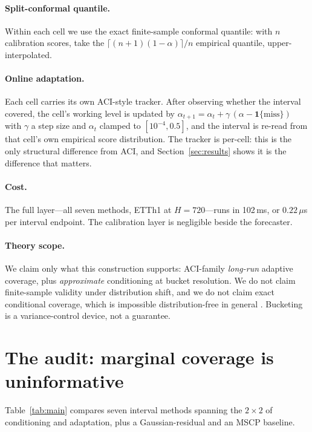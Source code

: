 \documentclass[11pt]{article}
\begin{document}
\paragraph{Split-conformal quantile.} Within each cell we use the exact finite-sample conformal quantile: with $n$ calibration scores, take the $\lceil (n+1)(1-\alpha) \rceil / n$ empirical quantile, upper-interpolated.

\paragraph{Online adaptation.} Each cell carries its own ACI-style tracker. After observing whether the interval covered, the cell's working level is updated by $\alpha_{t+1} = \alpha_t + \gamma\,(\alpha - \mathbf{1}\{\text{miss}\})$ with $\gamma$ a step size and $\alpha_t$ clamped to $[10^{-4}, 0.5]$, and the interval is re-read from that cell's own empirical score distribution. The tracker is per-cell: this is the only structural difference from ACI, and Section~\ref{sec:results} shows it is the difference that matters.

\paragraph{Cost.} The full layer---all seven methods, ETTh1 at $H=720$---runs in 102\,ms, or $0.22\,\mu$s per interval endpoint. The calibration layer is negligible beside the forecaster.

\paragraph{Theory scope.} We claim only what this construction supports: ACI-family \emph{long-run} adaptive coverage, plus \emph{approximate} conditioning at bucket resolution. We do not claim finite-sample validity under distribution shift, and we do not claim exact conditional coverage, which is impossible distribution-free in general \citep{gcc}. Bucketing is a variance-control device, not a guarantee.

\section{The audit: marginal coverage is uninformative}\label{sec:audit}

Table~\ref{tab:main} compares seven interval methods spanning the $2\times2$ of conditioning and adaptation, plus a Gaussian-residual and an MSCP baseline.
\end{document}
